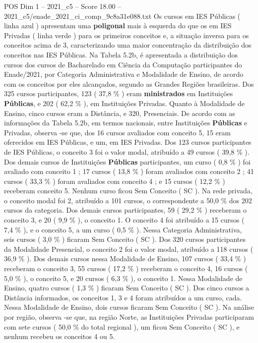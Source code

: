 \begin{textsample}{POS Dim 1 – 2021\_c5 – Score 18.00 – 2021\_c5/enade\_2021\_ci\_comp\_9c8a31e088.txt}
Os cursos em IES Públicas ( linha azul ) apresentam uma \textbf{poligonal} mais à esquerda do que os em IES Privadas ( linha verde ) para os primeiros conceitos e, a situação inversa para os conceitos acima de 3, caracterizando uma maior concentração da distribuição dos conceitos nas IES Públicas.
Na Tabela 5.2b, é apresentada a distribuição dos cursos dos cursos de Bacharelado em Ciência da Computação participantes do Enade/2021, por Categoria Administrativa e Modalidade de Ensino, de acordo com os conceitos por eles alcançados, segundo as Grandes Regiões brasileiras.
Dos 325 cursos participantes, 123 ( 37,8 \% ) eram \textbf{ministrados} em Instituições \textbf{Públicas}, e 202 ( 62,2 \% ), em Instituições Privadas.
Quanto à Modalidade de Ensino, cinco cursos eram a Distância, e 320, Presenciais.
De acordo com as informações da Tabela 5.2b, em termos nacionais, entre Instituições \textbf{Públicas} e Privadas, observa -se que, dos 16 cursos avaliados com conceito 5, 15 eram oferecidos em IES Públicas, e um, em IES Privadas.
Dos 123 cursos participantes de IES Públicas, o conceito 3 foi o valor modal, atribuído a 49 cursos ( 39,8 \% ).
Dos demais cursos de Instituições \textbf{Públicas} participantes, um curso ( 0,8 \% ) foi avaliado com conceito 1 ; 17 cursos ( 13,8 \% ) foram avaliados com conceito 2 ; 41 cursos ( 33,3 \% ) foram avaliados com conceito 4 ; e 15 cursos ( 12,2 \% ) receberam conceito 5.
Nenhum curso ficou Sem Conceito ( SC ).
Na rede privada, o conceito modal foi 2, atribuído a 101 cursos, o correspondente a 50,0 \% dos 202 cursos da categoria.
Dos demais cursos participantes, 59 ( 29,2 \% ) receberam o conceito 3, e 20 ( 9,9 \% ), o conceito 1.
O conceito 4 foi atribuído a 15 cursos ( 7,4 \% ), e o conceito 5, a um curso ( 0,5 \% ).
Nessa Categoria Administrativa, seis cursos ( 3,0 \% ) ficaram Sem Conceito ( SC ).
Dos 320 cursos participantes da Modalidade Presencial, o conceito 2 foi o valor modal, atribuído a 118 cursos ( 36,9 \% ).
Dos demais cursos nessa Modalidade de Ensino, 107 cursos ( 33,4 \% ) receberam o conceito 3, 55 cursos ( 17,2 \% ) receberam o conceito 4, 16 cursos ( 5,0 \% ), o conceito 5, e 20 cursos ( 6,3 \% ), o conceito 1.
Nessa Modalidade de Ensino, quatro cursos ( 1,3 \% ) ficaram Sem Conceito ( SC ).
Dos cinco cursos a Distância informados, os conceitos 1, 3 e 4 foram atribuídos a um curso, cada.
Nessa Modalidade de Ensino, dois cursos ficaram Sem Conceito ( SC ).
Na análise por região, observa -se que, na região Norte, as Instituições Privadas participaram com sete cursos ( 50,0 \% do total regional ), um ficou Sem Conceito ( SC ), e nenhum recebeu os conceitos 4 ou 5.

\end{textsample}
